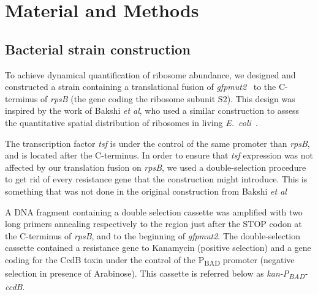 
\section{Material and Methods}

\subsection{Bacterial strain construction}
\label{sec:methods_strain}

To achieve dynamical quantification of ribosome abundance, we designed and constructed a strain containing a translational fusion of \textit{gfpmut2}~\cite{zaslaver_comprehensive_2006} to the C-terminus of \textit{rpsB} (the gene coding the ribosome subunit S2).
This design was inspired by the work of Bakshi \textit{et al}, who used a similar construction to assess the quantitative spatial distribution of ribosomes in living \textit{E.~coli}~\cite{bakshi_superresolution_2012}.

The transcription factor \textit{tsf} is under the control of the same promoter than \textit{rpsB}, and is located after the C-terminus.
In order to ensure that \textit{tsf} expression was not affected by our translation fusion on \textit{rpsB}, we used a double-selection procedure to get rid of every resistance gene that the construction might introduce.
This is something that was not done in the original construction from Bakshi \textit{et al}~\cite{bakshi_superresolution_2012}

A DNA fragment containing a double selection cassette was amplified with two long primers annealing respectively to the region just after the STOP codon at the C-terminus of \textit{rpsB}, and to the beginning of \textit{gfpmut2}.
The double-selection cassette contained a resistance gene to Kanamycin (positive selection) and a gene coding for the CcdB toxin under the control of the P\textsubscript{BAD} promoter (negative selection in presence of Arabinose).
This cassette is referred below as \textit{kan-P\textsubscript{BAD}-ccdB}.

